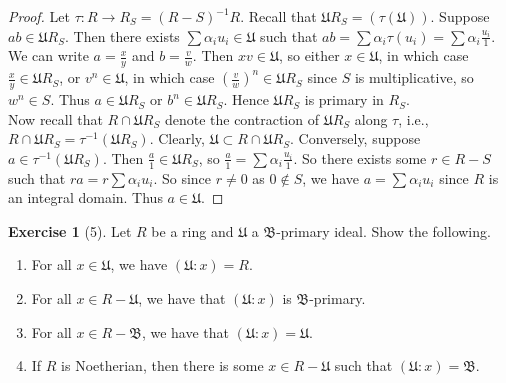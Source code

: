 \documentclass[reqno]{amsart}
\theoremstyle{definition}
\newtheorem{exercise}[theorem]{Exercise}
\theoremstyle{remark}
\begin{document}
\begin{proof}
    Let $\tau \colon R \to R_S = \left( R-S \right)^{-1}R$.
    Recall that
    $\mathfrak{U}R_S = \left( \tau \left(
    \mathfrak{U}\right)  \right) $.
    Suppose
    $ab \in \mathfrak{U}R_S$. Then
    there exists $\sum \alpha_i u_i
    \in \mathfrak{U}$ such that
    $ab = \sum \alpha_i \tau(u_i)
    = \sum \alpha_i \frac{u_i}{1}$.
    We can write
    $a = \frac{x}{y}$ and
    $b = \frac{v}{w}$.
    Then
    $xv \in \mathfrak{U}$, so
    either $x \in \mathfrak{U}$, in which case
    $\frac{x}{y} \in \mathfrak{U}R_S$, or
    $v^{n} \in \mathfrak{U}$, in which case
    $\left( \frac{v}{w} \right)^{n} \in
    \mathfrak{U}R_S$ since $S$ is multiplicative, so
    $w^{n} \in S$. Thus
    $a \in \mathfrak{U}R_S$ or
    $b^{n} \in \mathfrak{U}R_S$. Hence
    $\mathfrak{U}R_S$ is primary in $R_S$.\\
    Now recall that
    $R \cap \mathfrak{U}R_S$ denote the contraction
    of $\mathfrak{U}R_S$ along $\tau$, i.e.,
    $R \cap \mathfrak{U}R_S =
    \tau^{-1} \left( \mathfrak{U}R_S \right) $.
    Clearly,
    $\mathfrak{U} \subset
    R \cap \mathfrak{U}R_S$.
    Conversely, suppose
    $a \in \tau^{-1}\left( \mathfrak{U}R_S \right) $.
    Then
    $\frac{a}{1} \in \mathfrak{U}R_S$, so
    $\frac{a}{1} =
    \sum \alpha_i \frac{u_i}{1}$. So
    there exists some
    $r \in R-S$ such that
    $ra = r \sum \alpha_i u_i$. So
    since $r \neq 0$ as $0 \not\in S$, we have
    $a = \sum \alpha_i u_i$ since $R$ is an integral domain.
    Thus $a \in \mathfrak{U}$.
\end{proof}




\begin{exercise}[5]
    Let $R$ be a ring and $\mathfrak{U}$ a
    $\mathfrak{B}$-primary ideal. Show the following.
    \begin{enumerate}
        \item For all $x \in \mathfrak{U}$, we have
            $\left( \mathfrak{U} \colon x
            \right) = R$.
        \item For all $x \in R - \mathfrak{U}$,
            we have that
            $\left( \mathfrak{U} \colon x \right) $ is
            $\mathfrak{B}$-primary.
        \item For all $x \in
            R - \mathfrak{B}$, we have
            that $\left( \mathfrak{U}\colon x \right)
            = \mathfrak{U}$.
        \item If $R$ is Noetherian, then there is some
            $x \in R - \mathfrak{U}$ such that
            $\left( \mathfrak{U} \colon x \right)
            = \mathfrak{B}$.
    \end{enumerate}
\end{exercise}
\end{document}
